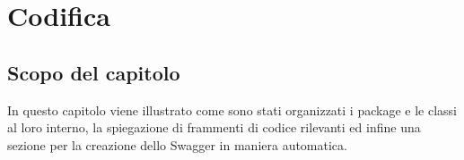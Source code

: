 \chapter{Codifica}
\label{cap:codifica}

\section{Scopo del capitolo}
In questo capitolo viene illustrato come sono stati organizzati i package e le classi al loro interno, la spiegazione di frammenti di codice rilevanti ed infine una sezione per la creazione dello Swagger in maniera automatica. \\










